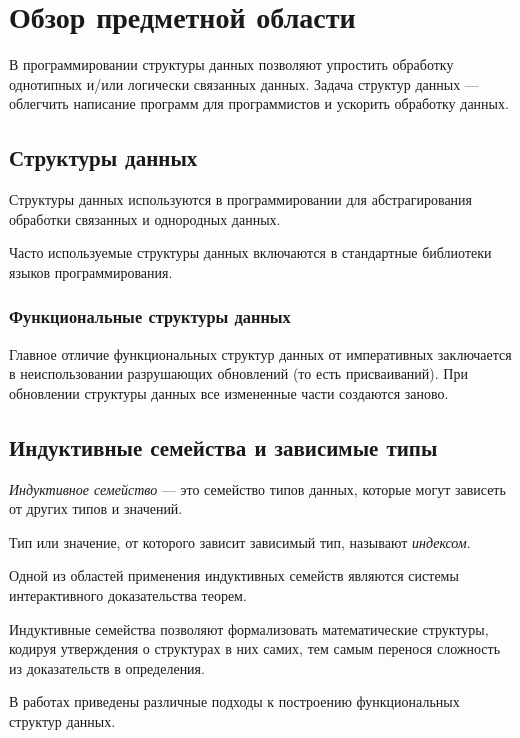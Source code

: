 \chapter{Обзор предметной области}
\label{chapter1}

В программировании структуры данных позволяют упростить обработку
однотипных и/или логически связанных данных.
Задача структур данных — облегчить написание программ для программистов и
ускорить обработку данных.

\section{Структуры данных}
Структуры данных используются в программировании для абстрагирования
обработки связанных и однородных данных.

Часто используемые структуры данных включаются в стандартные библиотеки
языков программирования.

\subsection{Функциональные структуры данных}

Главное отличие функциональных структур данных от императивных \cite{OkasakiBook}
заключается в неиспользовании разрушающих обновлений (то есть присваиваний).
При обновлении структуры данных все измененные части создаются заново.

\section{Индуктивные семейства и зависимые типы}

\begin{definition}
\emph{Индуктивное семейство} \cite{DybjerIndFam}— это семейство типов данных,
которые могут зависеть от других типов и значений.

Тип или значение, от которого зависит зависимый тип, называют \emph{индексом}.
\end{definition}

Одной из областей применения индуктивных семейств являются системы интерактивного
доказательства теорем.

Индуктивные семейства позволяют формализовать математические структуры,
кодируя утверждения о структурах в них самих, тем самым перенося сложность из
доказательств в определения.

В работах \cite{OkasakiThesis, McBridePivotal} приведены различные подходы
к построению функциональных структур данных.

